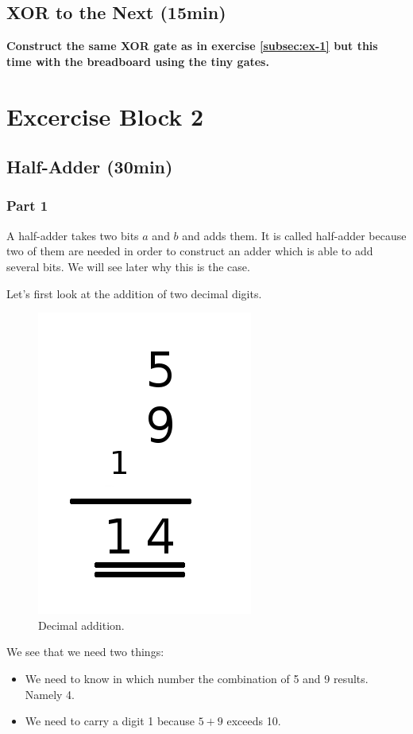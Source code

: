 \documentclass[10pt,a4paper]{article}
\begin{document}
\subsection{XOR to the Next (15min)}
\textbf{Construct the same XOR gate as in exercise \ref{subsec:ex-1} but this time with the breadboard using the tiny gates.}


\section{Excercise Block 2}

\subsection{Half-Adder (30min)}
\subsubsection{Part 1}
A half-adder takes two bits $a$ and $b$ and adds them. It is called half-adder because two of them are needed in order to construct an adder which is able to add several bits. We will see later why this is the case.

Let's first look at the addition of two decimal digits. 

\begin{figure}[h]
	\centering		  
	\includegraphics[scale=0.3]{decimal_addition.png}
	\caption{Decimal addition.}
	\label{fig:decimal_addition}
\end{figure}
We see that we need two things:
\begin{itemize}
	\item We need to know in which number the combination of 5 and 9 results. Namely 4.
	\item We need to carry a digit 1 because $5+9$ exceeds 10.
\end{itemize}
\end{document}
